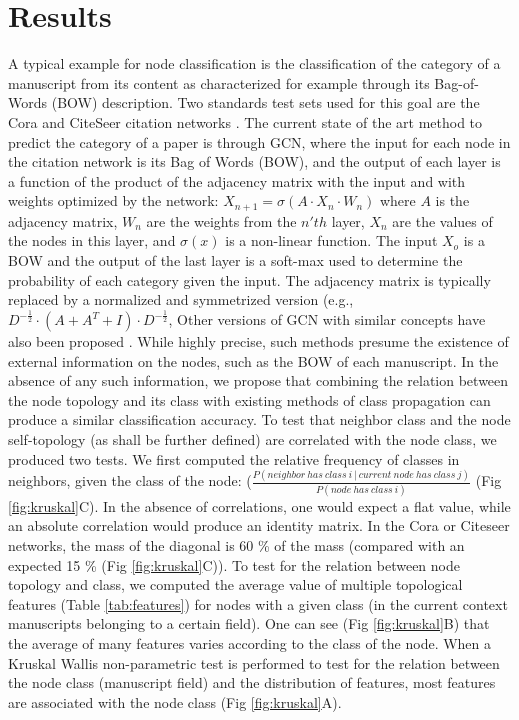 \section{Results}

A typical example for node classification is the classification of the category of a manuscript from its content as characterized for example through its Bag-of-Words (BOW) description. Two standards test sets used for this goal are the Cora and CiteSeer citation networks \cite{giles1998citeseer}. The current state of the art method to predict the category of a paper is through GCN, where the input for each node in the citation network is its Bag of Words (BOW), and the output of each layer is a function of the product of the adjacency matrix with the input and with weights optimized by the network: $X_{n+1}=\sigma(A\cdot X_{n}\cdot W_{n})$
where $A$ is the adjacency matrix, $W_{n}$ are the weights from the $n'th$ layer, $X_{n}$ are the values of the nodes in this layer, and $\sigma(x)$ is a non-linear function. The input $X_{o}$ is a BOW and the output of the last layer is a soft-max used to determine the probability of each category given the input. The adjacency matrix is typically replaced by a normalized and symmetrized version (e.g., $D^{-\frac{1}{2}}\cdot (A+A^{T}+I)\cdot D^{-\frac{1}{2}}$, Other versions of GCN with similar concepts have also been proposed \cite{schlichtkrull2017modeling}\cite{masci2015shapenet}\cite{henaff2015deep}\cite{duvenaud2015convolutional}\cite{thomas2016semi}. 
While highly precise, such methods presume the existence of external information on the nodes, such as the BOW of each manuscript. In the absence of any such information, we propose that combining the relation between the node topology and its class with existing methods of class propagation can produce a similar classification accuracy. 
To test that neighbor class and the node self-topology (as shall be further defined) are correlated with the node class, we produced two tests. We first computed the relative frequency of classes in neighbors, given the class of the node: ($\frac{P(neighbor\:has\:class\:i│current\:node\:has\:class\:j)}{P(node\:has\:class\:i)}$  (Fig \ref{fig:kruskal}C). In the absence of correlations, one would expect a flat value, while an absolute correlation would produce an identity matrix. In the Cora or Citeseer networks, the mass of the diagonal is 60 \% of the mass (compared with an expected 15 \% (Fig \ref{fig:kruskal}C)).
To test for the relation between node topology and class, we computed the average value of multiple topological features (Table \ref{tab:features}) for nodes with a given class (in the current context manuscripts belonging to a certain field). One can see (Fig \ref{fig:kruskal}B) that the average of many features varies according to the class of the node. When a Kruskal Wallis non-parametric test is performed to test for the relation between the node class (manuscript field) and the distribution of features, most features are associated with the node class (Fig \ref{fig:kruskal}A). 
